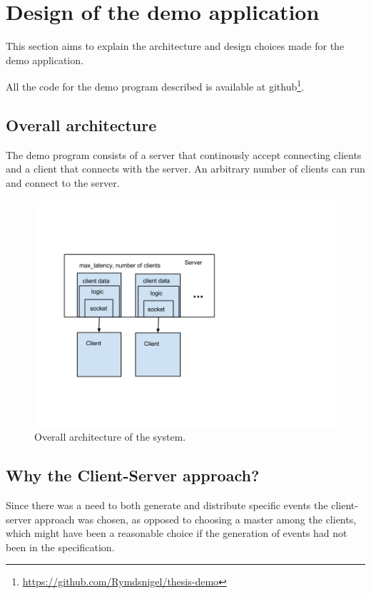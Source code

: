 \chapter{Design of the demo application}

This section aims to explain the architecture and design choices made for the demo application.

All the code for the demo program described is available at github\footnote{ \url{https://github.com/Rymdsnigel/thesis-demo}}.

\section{Overall architecture}
The demo program consists of a server that continously accept connecting clients and a client that connects with the server. An arbitrary number of clients can run and connect to the server.  

\begin{figure}[h!]
\centering
\includegraphics[width=1.0\textwidth]{figures/arch.png}
\caption{Overall architecture of the system.}
\end{figure}

\section{Why the Client-Server approach?}
Since there was a need to both generate and distribute specific events the client-server approach was chosen, as opposed to choosing a master among the clients, which might have been a reasonable choice if the generation of events had not been in the specification. 

